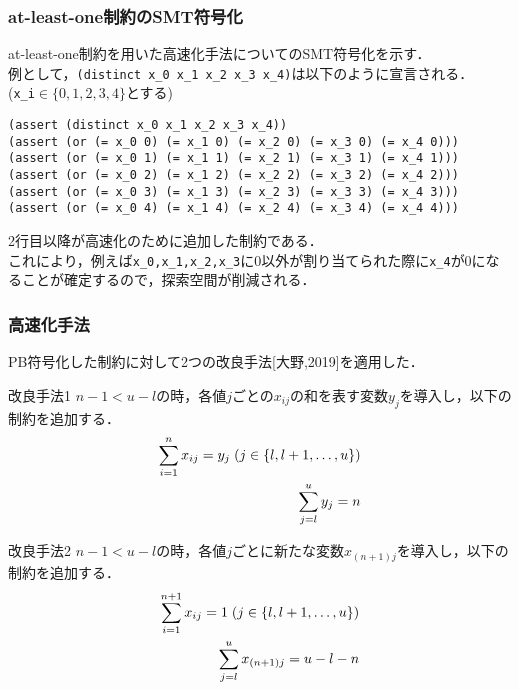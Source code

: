 \begin{frame}[fragile]\small
    \frametitle{at-least-one制約のSMT符号化}
    at-least-one制約を用いた高速化手法についてのSMT符号化を示す．\\
    例として，\verb|(distinct x_0 x_1 x_2 x_3 x_4)|は以下のように宣言される．\\
    (\verb|x_i|$\in \{0,1,2,3,4\}$とする)
    \begin{exampleblock}{}\scriptsize
\begin{verbatim}
(assert (distinct x_0 x_1 x_2 x_3 x_4))
(assert (or (= x_0 0) (= x_1 0) (= x_2 0) (= x_3 0) (= x_4 0)))
(assert (or (= x_0 1) (= x_1 1) (= x_2 1) (= x_3 1) (= x_4 1)))
(assert (or (= x_0 2) (= x_1 2) (= x_2 2) (= x_3 2) (= x_4 2)))
(assert (or (= x_0 3) (= x_1 3) (= x_2 3) (= x_3 3) (= x_4 3)))
(assert (or (= x_0 4) (= x_1 4) (= x_2 4) (= x_3 4) (= x_4 4)))
\end{verbatim}
    \end{exampleblock}
    2行目以降が高速化のために追加した制約である．\\
    これにより，例えば\verb|x_0,x_1,x_2,x_3|に0以外が割り当てられた際に\verb|x_4|が0になることが確定するので，探索空間が削減される．
\end{frame}


\begin{frame}\footnotesize
    \frametitle{高速化手法}
    PB符号化した\distinct 制約に対して2つの改良手法[大野,2019]を適用した．
    \begin{block}{改良手法1}
        $n-1 < u-l$の時，各値$j$ごとの$x_{ij}$の和を表す変数$y_{j}$を導入し，以下の制約を追加する．
        \vspace{-3mm}
        \begin{eqnarray*}
            \sum_{i=1}^{n} x_{ij}=y_j \; (j \in \{l,l+1, \ldots,u\})\\
            \vspace{-3mm}
            \sum_{j=l}^{u} y_j = n
        \end{eqnarray*}
    \end{block}
    \vspace{-3mm}
    \begin{block}{改良手法2}
        $n-1 < u-l$の時，各値$j$ごとに新たな変数$x_{(n+1)j}$を導入し，以下の制約を追加する．
        \vspace{-3mm}
        \begin{eqnarray*}
            \sum_{i=1}^{n+1} x_{ij}=1 \; (j \in \{l,l+1, \ldots,u\})\\
            \vspace{-3mm}
            \sum_{j=l}^{u} x_{(n+1)j} = u-l-n
        \end{eqnarray*}
    \end{block}
\end{frame}


